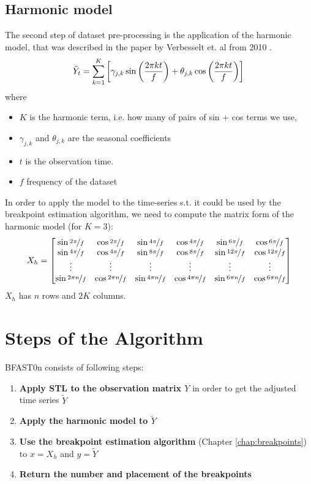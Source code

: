 \documentclass[main.tex]{subfiles}
\begin{document}
\subsection{Harmonic model}
\label{subsec:harmonic_model}
The second step of dataset pre-processing is the application of the harmonic
model, that was described in the paper by Verbesselt et. al from 2010 \cite{bfast1}.
\[
\tilde{Y}_t =
\sum_{k=1}^{K}\left[\gamma_{j, k} \sin \left(\frac{2 \pi k t}{f}\right)+
  \theta_{j, k} \cos \left(\frac{2 \pi k t}{f}\right)\right]\\
\]
where
\begin{itemize}
\item $K$ is the harmonic term, i.e. how many of pairs of sin + cos terms we use,
\item $\gamma_{j, k}$ and $\theta_{j, k}$ are the seasonal coefficients
\item $t$ is the observation time.
\item $f$ frequency of the dataset
\end{itemize}
In order to apply the model to the time-series s.t. it could be used by the
breakpoint estimation algorithm, we need to compute the matrix form of the
harmonic model (for $K=3$):
\[
X_{h} =
\begin{bmatrix}
  \sin\nicefrac{2 \pi}{f} & \cos\nicefrac{2 \pi}{f} & \sin\nicefrac{4 \pi}{f} & \cos\nicefrac{4
    \pi}{f} &  \sin\nicefrac{6 \pi}{f} & \cos\nicefrac{6 \pi}{f} \\
  \sin\nicefrac{4 \pi}{f} & \cos\nicefrac{4 \pi}{f} & \sin\nicefrac{8 \pi}{f} & \cos\nicefrac{8
    \pi}{f} &  \sin\nicefrac{12 \pi}{f} & \cos\nicefrac{12 \pi}{f} \\
  \vdots & \vdots  & \vdots & \vdots & \vdots & \vdots \\
  \sin\nicefrac{2 \pi n}{f} & \cos\nicefrac{2 \pi n}{f} & \sin\nicefrac{4 \pi n}{f} &
  \cos\nicefrac{4 \pi n}{f} &  \sin\nicefrac{6 \pi n}{f} & \cos\nicefrac{6 \pi n}{f}
\end{bmatrix}
\]
$X_h$ has $n$ rows and $2K$ columns.

\section{Steps of the Algorithm}
\label{sec:bfast0n_algorithm_steps}
BFAST0n consists of following steps:
\begin{enumerate}
\item \textbf{Apply STL to the observation matrix $Y$} in order to get the adjusted
  time series $\tilde{Y}$
\item \textbf{Apply the harmonic model to $\tilde{Y}$}
\item \textbf{Use the breakpoint estimation algorithm} (Chapter \ref{chap:breakpoints})
  to $x=X_h$ and $y=\tilde{Y}$
\item \textbf{Return the number and placement of the breakpoints}
\end{enumerate}
\end{document}
